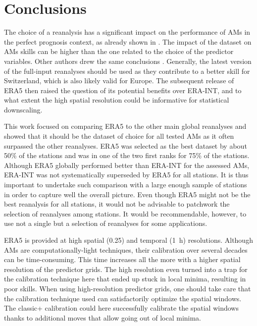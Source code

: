 \documentclass[alpha-refs]{wiley-article}
\begin{document}
\section{Conclusions}
\label{sec:conclusion}

The choice of a reanalysis has a significant impact on the performance of AMs in the perfect prognosis context, as already shown in \citet{Horton2018b}. The impact of the dataset on AMs skills can be higher than the one related to the choice of the predictor variables. Other authors drew the same conclusions \cite{Dayon2015}. Generally, the latest version of the full-input reanalyses should be used as they contribute to a better skill for Switzerland, which is also likely valid for Europe. The subsequent release of ERA5 then raised the question of its potential benefits over ERA-INT, and to what extent the high spatial resolution could be informative for statistical downscaling.

This work focused on comparing ERA5 to the other main global reanalyses and showed that it should be the dataset of choice for all tested AMs as it often surpassed the other reanalyses. ERA5 was selected as the best dataset by about 50\% of the stations and was in one of the two first ranks for 75\% of the stations. Although ERA5 globally performed better than ERA-INT for the assessed AMs, ERA-INT was not systematically superseded by ERA5 for all stations. It is thus important to undertake such comparison with a large enough sample of stations in order to capture well the overall picture. Even though ERA5 might not be the best reanalysis for all stations, it would not be advisable to patchwork the selection of reanalyses among stations. It would be recommendable, however, to use not a single but a selection of reanalyses for some applications.

ERA5 is provided at high spatial (0.25\degree) and temporal (1~h) resolutions. Although AMs are computationally-light techniques, their calibration over several decades can be time-consuming. This time increases all the more with a higher spatial resolution of the predictor grids. The high resolution even turned into a trap for the calibration technique here that ended up stuck in local minima, resulting in poor skills. When using high-resolution predictor grids, one should take care that the calibration technique used can satisfactorily optimize the spatial windows. The classic+ calibration \citep{Horton2019} could here successfully calibrate the spatial windows thanks to additional moves that allow going out of local minima. 
\end{document}

